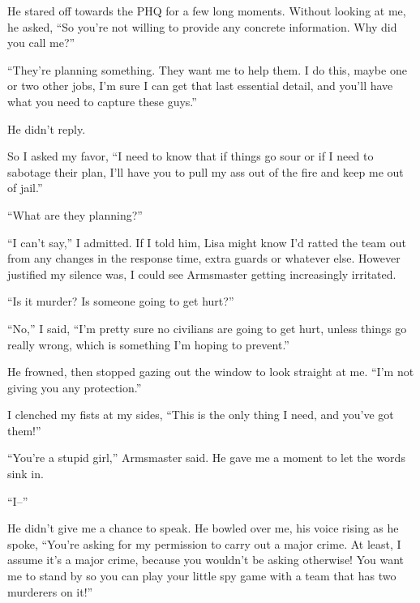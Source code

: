 He stared off towards the PHQ for a few long moments.  Without looking at me, he asked, ``So you're not willing to provide any concrete information.  Why did you call me?''



``They're planning something.  They want me to help them.  I do this, maybe one or two other jobs, I'm sure I can get that last essential detail, and you'll have what you need to capture these guys.''



He didn't reply.



So I asked my favor, ``I need to know that if things go sour or if I need to sabotage their plan, I'll have you to pull my ass out of the fire and keep me out of jail.''



``What are they planning?''



``I can't say,'' I admitted.  If I told him, Lisa might know I'd ratted the team out from any changes in the response time, extra guards or whatever else.  However justified my silence was, I could see Armsmaster getting increasingly irritated.



``Is it murder?  Is someone going to get hurt?''



``No,'' I said, ``I'm pretty sure no civilians are going to get hurt, unless things go really wrong, which is something I'm hoping to prevent.''



He frowned, then stopped gazing out the window to look straight at me. ``I'm not giving you any protection.''



I clenched my fists at my sides, ``This is the only thing I need, and you've got them!''



``You're a stupid girl,'' Armsmaster said.  He gave me a moment to let the words sink in.



``I--''



He didn't give me a chance to speak.  He bowled over me, his voice rising as he spoke, ``You're asking for my permission to carry out a major crime.  At least, I assume it's a major crime, because you wouldn't be asking otherwise!  You want me to stand by so you can play your little spy game with a team that has two murderers on it!''



